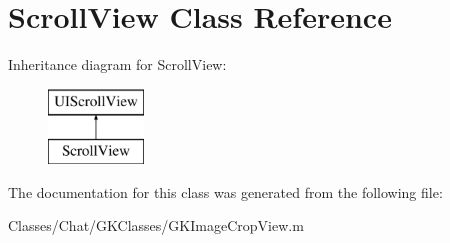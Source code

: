 \hypertarget{interface_scroll_view}{}\section{Scroll\+View Class Reference}
\label{interface_scroll_view}
Inheritance diagram for Scroll\+View\+:\begin{figure}[H]
\begin{center}
\leavevmode
\includegraphics[height=2.000000cm]{interface_scroll_view}
\end{center}
\end{figure}


The documentation for this class was generated from the following file\+:\begin{DoxyCompactItemize}
\item 
Classes/\+Chat/\+G\+K\+Classes/G\+K\+Image\+Crop\+View.\+m\end{DoxyCompactItemize}
